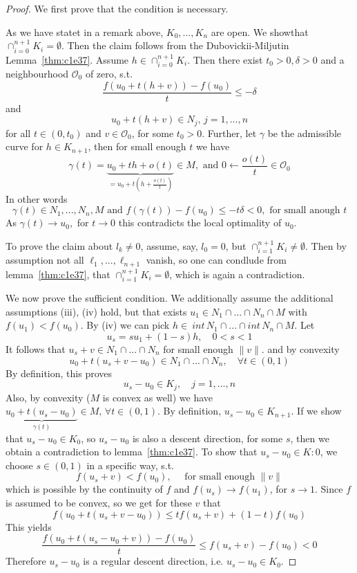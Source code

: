 \documentclass[../skript.tex]{subfiles}
\begin{document}
\begin{proof}
	We first prove that the condition is necessary.\par
	As we have statet in a remark above, $K_0,...,K_n$ are open. We showthat $\cap_{i=0}^{n+1}K_i=\emptyset$. Then the claim follows from the Dubovickii-Miljutin Lemma~\ref{thm:c1e37}. Assume $h\in\cap_{i=0}^{n+1}K_i$. Then there exist $t_0>0,\delta>0$ and a neighbourhood $\mathcal{O}_0$ of zero, s.t.
	\[
		\frac{f(u_0+  t(h+v)) - f(u_0)}{t}\leq -\delta 
	\]
	and
	\[
		u_0 + t(h+v)\in N_j,\,j=1,...,n
	\]
	for all $t\in(0,t_0)$ and $v\in\mathcal{O}_0$, for some $t_0 > 0$. Further, let $\gamma$ be the admissible curve for $h\in K_{n+1}$, then for small enough $t$ we have
	\[
		\gamma(t) = \underbrace{u_0 + th + o(t)}_{=u_0 + t(h+\frac{o(t)}{t})}\in M,\text{ and }0\leftarrow\frac{o(t)}{t}\in\mathcal{O}_0
	\]
	In other words
	\[
		\gamma(t)\in N_1,...,N_n,M\text{ and }f(\gamma(t)) - f(u_0) \leq -t\delta < 0,\text{ for small anough }t
	\]
	As $\gamma(t)\to u_0,$ for $t\to 0$ this contradicts the local optimality of $u_0$.\par
	To prove the claim about $l_k\not=0$, assume, say, $l_0 = 0$, but $\cap_{i=1}^{n+1}K_i\not=\emptyset$. Then by assumption not all $\ell_1,...,\ell_{n+1}$ vanish, so one can condlude from lemma~\ref{thm:c1e37}, that $\cap_{i=1}^{n+1}K_i = \emptyset$, which is again a contradiction.\par
	We now prove the sufficient condition. We additionally assume the additional assumptions (iii), (iv) hold, but that exists $u_1\in N_1\cap...\cap N_n\cap M$ with $f(u_1)<f(u_0)$. By (iv) we can pick $h\in\ int\,N_1 \cap...\cap int\,N_n\cap M$. Let
	\[
		u_s = su_1 + (1-s)h,\quad 0<s<1
	\]
	It follows that $u_s+v\in N_1\cap...\cap N_n$ for small enough $\|v\|$. and by convexity
	\[
		u_0 + t(u_s+v-u_0)\in N_1\cap...\cap N_n,\quad\forall t\in (0,1)
	\]
	By definition, this proves
	\[
		u_s-u_0\in K_j,\quad j=1,...,n
	\]
	Also, by convexity ($M$ is convex as well) we have $\underbrace{u_0 + t(u_s-u_0)}_{\gamma(t)}\in M,\,\forall t\in(0,1)$. By definition, $u_s-u_0 \in K_{n+1}$. If we show that $u_s-u_0\in K_0$, so $u_s-u_0$ is also a descent direction, for some $s$, then we obtain a contradiction to lemma~\ref{thm:c1e37}. To show that $u_s-u_0\in K:0$, we choose $s\in(0,1)$ in a specific way, s.t.
	\[
		f(u_s+v) < f(u_0),\quad\text{ for small enough }\|v\|
	\]
	which is possible by the continuity of $f$ and $f(u_s)\to f(u_1)$, for $s\to 1$. Since $f$ is assumed to be convex, so we get for these $v$ that
	\[
		f(u_0+t(u_s+v-u_0)) \leq t f(u_s+v) + (1-t) f(u_0)
	\]
	This yields
	\[
		\frac{f(u_0+t(u_s-u_0+v))-f(u_0)}{t}\leq f(u_s+v)-f(u_0) < 0
	\]
	Therefore $u_s-u_0$ is a regular descent direction, i.e. $u_s-u_0\in K_0$.
\end{proof}
\end{document}
